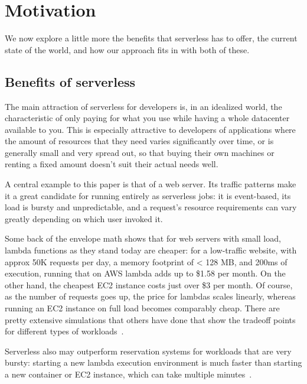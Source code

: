 \section{Motivation}\label{motivation}

We now explore a little more the benefits that serverless has to offer, the
current state of the world, and how our approach fits in with both of these.

\subsection{Benefits of serverless}

The main attraction of serverless for developers is, in an idealized world, the
characteristic of only paying for what you use while having a whole datacenter
available to you. This is especially attractive to developers of applications
where the amount of resources that they need varies significantly over time, or
is generally small and very spread out, so that buying their own machines or
renting a fixed amount doesn't suit their actual needs well.

A central example to this paper is that of a web server. Its traffic patterns
make it a great candidate for running entirely as serverless jobs: it is
event-based, its load is bursty and unpredictable, and a request's resource
requirements can vary greatly depending on which user invoked it.


Some back of the envelope math shows that for web servers with small load,
lambda functions as they stand today are cheaper: for a low-traffic website,
with approx 50K requests per day, a memory footprint of < 128 MB, and 200ms of
execution, running that on AWS lambda adds up to \$1.58 per month. On the other
hand, the cheapest EC2 instance costs just over \$3 per month. Of course, as the
number of requests goes up, the price for lambdas scales linearly, whereas
running an EC2 instance on full load becomes comparably cheap. There are pretty
extensive simulations that others have done that show the tradeoff points for
different types of workloads~\cite{econ-of-serverless,trek10-blog}.

Serverless also may outperform reservation systems for workloads that are very
bursty: starting a new lambda execution environment is much faster than starting
a new container or EC2 instance, which can take multiple
minutes~\cite{ec2-autoscaling}.



